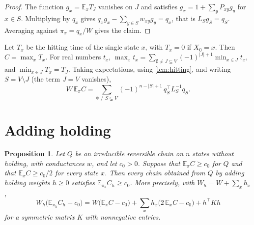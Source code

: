 \documentclass[11pt]{amsart}
\newtheorem{proposition}[theorem]{Proposition}
\theoremstyle{remark}
\newcommand{\E}{\mathbb{E}}
\begin{document}
\begin{proof}
The function $g_x=\E_xT_J$ vanishes on $J$ and satisfies $g_x=1+\sum_yP_{xy}g_y$ for $x\in S$. Multiplying by $q_x$
gives $q_xg_x-\sum_{y\in S}w_{xy}g_y=q_x$, that is $L_Sg_S=q_S$. Averaging against $\pi_x=q_x/W$ gives the claim.
\end{proof}

Let $T_x$ be the hitting time of the single state $x$, with $T_x=0$ if $X_0=x$. Then $C=\max_xT_x$. For real numbers
$t_x$, $\max_xt_x=\sum_{\emptyset\ne J\subseteq V}(-1)^{|J|+1}\min_{x\in J}t_x$, and $\min_{x\in J}T_x=T_J$. Taking
expectations, using \cref{lem:hitting}, and writing $S=V\setminus J$ (the term $J=V$ vanishes),
\begin{equation}\label{eq:maxmin}
W\,\E_\pi C=\sum_{\emptyset\ne S\subsetneq V}(-1)^{n-|S|+1}\,q_S^{\top}L_S^{-1}q_S .
\end{equation}

\section{Adding holding}\label{sec:holding}

\begin{proposition}\label{prop:holding}
Let $Q$ be an irreducible reversible chain on $n$ states without holding, with conductances $w$, and let $c_0>0$.
Suppose that $\E_\pi C\ge c_0$ for $Q$ and that $\E_xC\ge c_0/2$ for every state $x$. Then every chain obtained from
$Q$ by adding holding weights $h\ge0$ satisfies $\E_{\pi_h}C_h\ge c_0$. More precisely, with $W_h=W+\sum_xh_x$,
\begin{equation}\label{eq:holding}
W_h\bigl(\E_{\pi_h}C_h-c_0\bigr)=W\bigl(\E_\pi C-c_0\bigr)+\sum_xh_x\bigl(2\,\E_xC-c_0\bigr)+h^{\top}Kh
\end{equation}
for a symmetric matrix $K$ with nonnegative entries.
\end{proposition}
\end{document}

